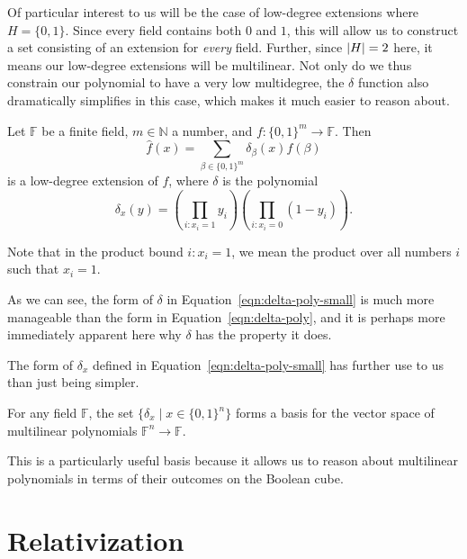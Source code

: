 Of particular interest to us will be the case of low-degree extensions where
$H = \{0, 1\}$. Since every field contains both $0$ and $1$, this will allow us
to construct a set consisting of an extension for \emph{every} field. Further,
since $\lvert H\rvert = 2$ here, it means our low-degree extensions will be
multilinear. Not only do we thus constrain our polynomial to have a very low
multidegree, the $\delta$ function also dramatically simplifies in this case, which
makes it much easier to reason about.

\begin{cor}[{\cite[\defaultS 4.1]{AW09}}]
  Let $\mathbb{F}$ be a finite field, $m \in \mathbb{N}$ a number, and
  $f: \{0, 1\}^{m} \rightarrow \mathbb{F}$. Then
  \begin{equation}
    \hat{f}(x) = \sum_{\beta \in \{0, 1\}^{m}}\delta_{\beta}(x)f(\beta)
  \end{equation}
  is a low-degree extension of $f$, where $\delta$ is the polynomial
  \begin{equation}\label{eqn:delta-poly-small}
    \delta_{x}(y) = \left(\prod_{i:x_{i}=1}y_{i}\right)\left(\prod_{i:x_{i}=0}(1 - y_{i})\right).
  \end{equation}
\end{cor}
Note that in the product bound $i:x_{i} = 1$, we mean the product over all
numbers $i$ such that $x_{i} = 1$.

As we can see, the form of $\delta$ in Equation~\eqref{eqn:delta-poly-small} is much
more manageable than the form in Equation~\eqref{eqn:delta-poly}, and it is
perhaps more immediately apparent here why $\delta$ has the property it does.

The form of $\delta_{x}$ defined in Equation~\eqref{eqn:delta-poly-small} has further
use to us than just being simpler.

\begin{thm}[{\cite[\defaultS 4.1]{AW09}}]
  For any field $\mathbb{F}$, the set $\{\delta_{x} \mid x \in \{0, 1\}^{n}\}$ forms a
  basis for the vector space of multilinear polynomials
  $\mathbb{F}^{n} \rightarrow \mathbb{F}$.
\end{thm}

This is a particularly useful basis because it allows us to reason about
multilinear polynomials in terms of their outcomes on the Boolean cube.

\section{Relativization}

